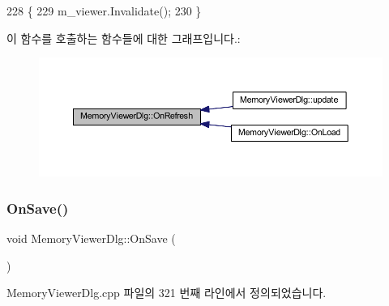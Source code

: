 \begin{DoxyCode}
228 \{
229   m\_viewer.Invalidate();
230 \}
\end{DoxyCode}
이 함수를 호출하는 함수들에 대한 그래프입니다.\+:
\nopagebreak
\begin{figure}[H]
\begin{center}
\leavevmode
\includegraphics[width=350pt]{class_memory_viewer_dlg_a2c10fa49648424e4994c8c5a71f4effc_icgraph}
\end{center}
\end{figure}
\mbox{\label{class_memory_viewer_dlg_aaa3651f618355f6d1d3bf3158cb9c812}} 
\subsubsection{\texorpdfstring{On\+Save()}{OnSave()}}
{\footnotesize\ttfamily void Memory\+Viewer\+Dlg\+::\+On\+Save (\begin{DoxyParamCaption}{ }\end{DoxyParamCaption})\hspace{0.3cm}{\ttfamily [protected]}}



Memory\+Viewer\+Dlg.\+cpp 파일의 321 번째 라인에서 정의되었습니다.


